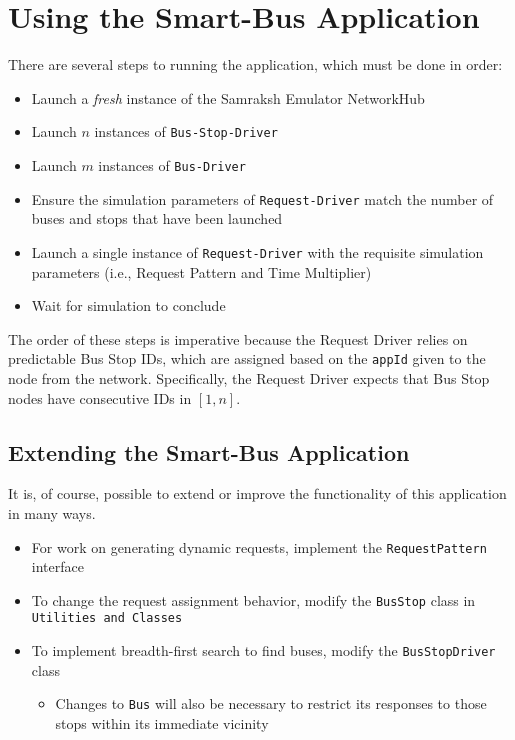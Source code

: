 \documentclass[runningheads]{llncs}
\begin{document}
\section{Using the Smart-Bus Application}
There are several steps to running the application, which must be done in order:
\begin{itemize}
  \item Launch a \emph{fresh} instance of the Samraksh Emulator NetworkHub
	\item Launch $n$ instances of \lstinline{Bus-Stop-Driver}
	\item Launch $m$ instances of \lstinline{Bus-Driver}
	\item Ensure the simulation parameters of \lstinline{Request-Driver} match the number of buses and stops that have been launched
	\item Launch a single instance of \lstinline{Request-Driver} with the requisite simulation parameters (i.e., Request Pattern and Time Multiplier)
	\item Wait for simulation to conclude
\end{itemize}

The order of these steps is imperative because the Request Driver relies on predictable Bus Stop IDs, which are assigned based on the \lstinline{appId} given to the node from the network. Specifically, the Request Driver expects that Bus Stop nodes have consecutive IDs in $[1, n]$.

\subsection{Extending the Smart-Bus Application}
It is, of course, possible to extend or improve the functionality of this application in many ways.
\begin{itemize}
	\item For work on generating dynamic requests, implement the \lstinline{RequestPattern} interface 
	\item To change the request assignment behavior, modify the \lstinline{BusStop} class in \lstinline{Utilities and Classes}
	\item To implement breadth-first search to find buses, modify the \lstinline{BusStopDriver} class
	\begin{itemize}
		\item Changes to \lstinline{Bus} will also be necessary to restrict its responses to those stops within its immediate vicinity
	\end{itemize}
\end{itemize}
\end{document}
